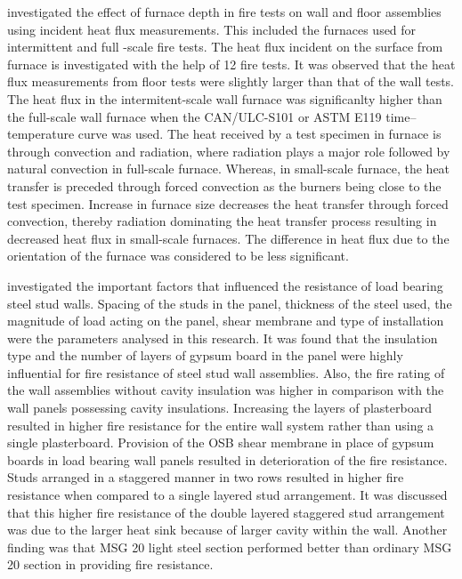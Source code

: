 \citet{Sultan2006} investigated the effect of furnace depth in fire tests on wall and floor assemblies using incident heat flux measurements. This included the furnaces used for intermittent and full -scale fire tests. The heat flux incident on the surface from furnace is investigated with the help of 12 fire tests. It was observed that the heat flux measurements from floor tests were slightly larger than that of the wall tests. The heat flux in the intermitent-scale wall furnace was significanlty higher than the full-scale wall furnace when the CAN/ULC-S101 or ASTM E119 time–temperature curve was used. The heat received by a test specimen in furnace is through convection and radiation, where radiation plays a major role followed by natural convection in full-scale furnace. Whereas, in small-scale furnace, the heat transfer is preceded through forced convection as the burners being close to the test specimen. Increase in furnace size decreases the heat transfer through forced convection, thereby radiation dominating the heat transfer process resulting in decreased heat flux in small-scale furnaces. The difference in heat flux due to the orientation of the furnace was considered to be less significant. 

\citet{Kodur2006} investigated the important factors that influenced the resistance of load bearing steel stud walls. Spacing of the studs in the panel, thickness of the steel used, the magnitude of load acting on the panel, shear membrane and type of installation were the parameters analysed in this research. It was found that the insulation type and the number of layers of gypsum board in the panel were highly influential for fire resistance of steel stud wall assemblies. Also, the fire rating of the wall assemblies without cavity insulation was higher in comparison with the wall panels possessing cavity insulations. Increasing the layers of plasterboard resulted in higher fire resistance for the entire wall system rather than using a single plasterboard. Provision of the OSB shear membrane in place of gypsum boards in load bearing wall panels resulted in deterioration of the fire resistance. Studs arranged in a staggered manner in two rows resulted in higher fire resistance when compared to a single layered stud arrangement. It was discussed that this higher fire resistance of the double layered staggered stud arrangement was due to the larger heat sink because of larger cavity within the wall. Another finding was that MSG 20 light steel section performed better than ordinary MSG 20 section in providing fire resistance.

